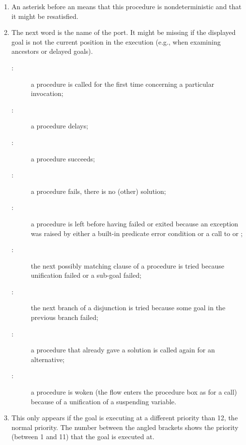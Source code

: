 \begin{enumerate}
\item An asterisk before an  means that this
procedure is nondeterministic and that it might be resatisfied.

\item The next word is the name of the port.
It might be missing if the displayed goal is not the current position
in the execution (e.g., when examining ancestors or delayed goals).

\begin{description}
\item[:] a procedure is called for the first time concerning a
  particular
invocation;

\item[:] a procedure delays;

\item[:] a procedure succeeds;

\item[:] a procedure fails, there is no (other) solution;

\item[:] a procedure is left before having failed or exited
  because an exception was raised by either a built-in predicate error
condition or a call to 
or ;

\item[:] the next possibly matching clause of a procedure is
  tried
because unification failed or a sub-goal failed;

\item[:] the next branch of a disjunction is tried because some
  goal
in the previous branch failed;

\item[:] a procedure that already gave a solution is called again
  for
an alternative;

\item[:] a procedure is woken (the flow enters the procedure
  box as for
a call) because of a unification of a suspending variable.


\end{description}

\item This only appears if the goal is executing at a different priority
  than 12, the normal priority. The number between the angled brackets
  shows the priority (between 1 and 11) that the  goal is executed at.


\end{enumerate}
